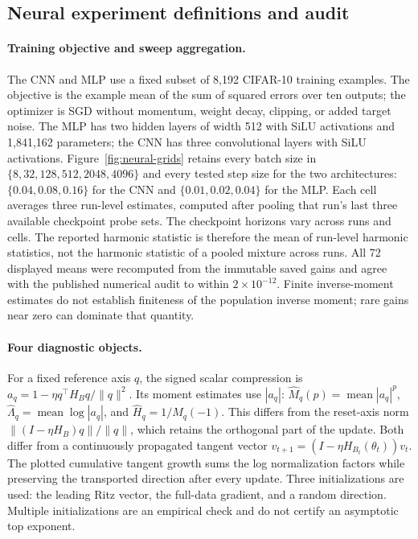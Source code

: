 \subsection{Neural experiment definitions and audit}
\label{app:empirical-details}
\paragraph{Training objective and sweep aggregation.}
The CNN and MLP use a fixed subset of 8,192 CIFAR-10 training examples.
The objective is the example mean of the sum of squared errors over ten outputs;
the optimizer is SGD without momentum, weight decay, clipping, or added target noise.
The MLP has two hidden layers of width 512 with SiLU activations and 1,841,162 parameters;
the CNN has three convolutional layers with SiLU activations.
Figure~\ref{fig:neural-grids} retains every batch size in
$\{8,32,128,512,2048,4096\}$ and every tested step size for the two architectures:
$\{0.04,0.08,0.16\}$ for the CNN and $\{0.01,0.02,0.04\}$ for the MLP.
Each cell averages three run-level estimates, computed after pooling that run's
last three available checkpoint probe sets. The checkpoint horizons vary across runs and cells.
The reported harmonic statistic is therefore the mean of run-level harmonic statistics,
not the harmonic statistic of a pooled mixture across runs.
All 72 displayed means were recomputed from the immutable saved gains and agree with the
published numerical audit to within $2\times10^{-12}$.
Finite inverse-moment estimates do not establish finiteness of the population inverse moment;
rare gains near zero can dominate that quantity.

\paragraph{Four diagnostic objects.}
For a fixed reference axis $q$, the signed scalar compression is
$a_q=1-\eta q^\top H_Bq/\|q\|^2$.
Its moment estimates use $|a_q|$: $\widehat M_q(p)=\operatorname{mean}|a_q|^p$,
$\widehat\Lambda_q=\operatorname{mean}\log|a_q|$, and
$\widehat H_q=1/\widehat M_q(-1)$.
This differs from the reset-axis norm $\|(I-\eta H_B)q\|/\|q\|$,
which retains the orthogonal part of the update.
Both differ from a continuously propagated tangent vector
$v_{t+1}=(I-\eta H_{B_t}(\theta_t))v_t$.
The plotted cumulative tangent growth sums the log normalization factors while preserving
the transported direction after every update. Three initializations are used: the leading
Ritz vector, the full-data gradient, and a random direction.
Multiple initializations are an empirical check and do not certify an asymptotic top exponent.

